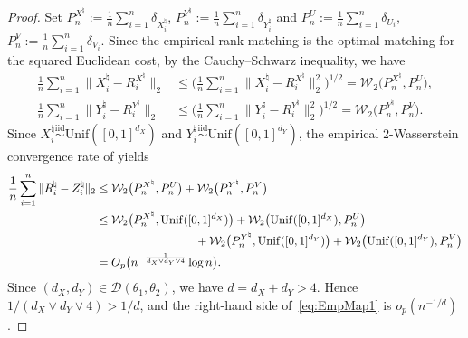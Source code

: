 \documentclass[11pt]{article}
\begin{document}
\begin{proof}
Set $ P_n^{X^\natural} := \frac{1}{n}\sum_{i = 1}^n \delta_{ X_i^\natural}$, $ P_n^{Y^\natural}:= \frac{1}{n}\sum_{i = 1}^n \delta_{ Y_i^\natural}$ and $ P_n^U := \frac{1}{n}\sum_{i = 1}^n \delta_{U_i}$, $P_n^V := \frac{1}{n}\sum_{i = 1}^n \delta_{V_i}$. 
Since the empirical rank matching is the optimal matching for the squared Euclidean cost, by the Cauchy--Schwarz inequality, we have
\begin{align*}
\frac{1}{n}\sum_{i = 1}^n \| X_i^\natural -  R_i^{X^\natural}\|_2
&\leq
\biggl(\frac{1}{n}\sum_{i = 1}^n \| X_i^\natural -  R_i^{X^\natural}\|_2^2\biggr)^{1/2}
= \mathcal{W}_2\bigl(P_n^{X^\natural}, P_n^U\bigr), \\
\frac{1}{n}\sum_{i = 1}^n \| Y_i^\natural -  R_i^{Y^\natural}\|_2
&\leq
\biggl(\frac{1}{n}\sum_{i = 1}^n \| Y_i^\natural -  R_i^{Y^\natural}\|_2^2\biggr)^{1/2}
= \mathcal{W}_2\bigl(P_n^{Y^\natural}, P_n^V\bigr).
\end{align*}
Since $X_i^\natural \stackrel{\mathrm{iid}}{\sim} \mathrm{Unif}([0,1]^{d_X})$ and $Y_i^\natural \stackrel{\mathrm{iid}}{\sim} \mathrm{Unif}([0,1]^{d_Y})$, the empirical $2$-Wasserstein convergence rate of \citet{fournier2015rate} yields
\begin{align}
\frac{1}{n}\sum_{i = 1}^n\|{R}_i^\natural - Z_i^\natural\|_2
&\leq \mathcal{W}_2\bigl(P_n^{X^\natural}, P_n^U\bigr) + \mathcal{W}_2\bigl(P_n^{Y^\natural}, P_n^V\bigr) \notag \\ 
&\leq \mathcal{W}_2\bigl(P_n^{X^\natural}, \mathrm{Unif}([0, 1]^{d_X})\bigr) + \mathcal{W}_2\bigl(\mathrm{Unif}([0, 1]^{d_X}), P_n^U\bigr) \notag \\ 
&\hspace{3cm}+\mathcal{W}_2\bigl(P_n^{Y^\natural}, \mathrm{Unif}([0, 1]^{d_Y})\bigr) + \mathcal{W}_2\bigl(\mathrm{Unif}([0, 1]^{d_Y}), P_n^V\bigr) \notag \\
&= O_p\bigl(n^{-\frac{1}{d_X \vee d_Y \vee 4}}\log n\bigr).\label{eq:EmpMap1}
\end{align}
Since $(d_X, d_Y)\in\mathcal{D}(\theta_1,\theta_2)$, we have $d=d_X+d_Y>4$. Hence $1/(d_X\vee d_Y\vee 4)>1/d$, and the right-hand side of~\eqref{eq:EmpMap1} is $o_p(n^{-1/d})$.


\end{proof}
\end{document}
